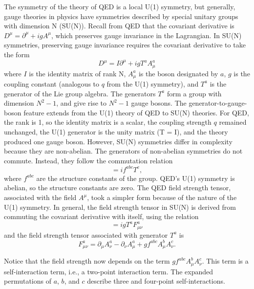 The symmetry of the theory of QED is a local U(1) symmetry, but generally, gauge theories in physics have symmetries described by special unitary groups with dimension N (SU(N)). Recall from QED that the covariant derivative is $D^{\mu} = \partial^{\mu} + igA^{\mu}$, which preserves gauge invariance in the Lagrangian. In SU(N) symmetries, preserving gauge invariance requires the covariant derivative to take the form
\begin{equation}
    D^\mu = I\partial^{\mu} + i g T^a A_{\mu}^a 
\end{equation}
where $I$ is the identity matrix of rank N, $A_{\mu}^a$ is the boson designated by $a$, $g$ is the coupling constant (analogous to $q$ from the U(1) symmetry), and $T^a$ is the generator of the Lie group algebra. The generators $T^a$ form a group with dimension $N^2-1$, and give rise to $N^2-1$ gauge bosons. The generator-to-gauge-boson feature extends from the U(1) theory of QED to SU(N) theories. For QED, the rank is 1, so the identity matrix is a scalar, the coupling strength $q$ remained unchanged, the U(1) generator is the unity matrix (T = I), and the theory produced one gauge boson. However, SU(N) symmetries differ in complexity because they are non-abelian. The generators of non-abelian symmetries do not commute. Instead, they follow the commutation relation
\begin{equation}
    [T^a,T^b] = i f^{abc} T^c,
\end{equation}
where $f^{abc}$ are the structure constants of the group. QED's U(1) symmetry is abelian, so the structure constants are zero. The QED field strength tensor, associated with the field $A^{\mu}$, took a simpler form because of the nature of the U(1) symmetry. In general, the field strength tensor in SU(N) is derived from commuting the covariant derivative with itself, using the relation
\begin{equation}
    [D_{\mu},D_{\nu}] = i g T^a F^a_{\mu\nu}
\end{equation}
and the field strength tensor associated with generator $T^a$ is
\begin{equation}
    F^a_{\mu\nu} = \partial_{\mu} A^a_{\nu} - \partial_{\nu} A^a_{\mu} + g f^{abc}A^b_{\mu}A^c_{\nu}.
\end{equation}

Notice that the field strength now depends on the term $g f^{abc}A^b_{\mu}A^c_{\nu}$. This term is a self-interaction term, i.e., a two-point interaction term. The expanded permutations of $a$, $b$, and $c$ describe three and four-point self-interactions.
    

